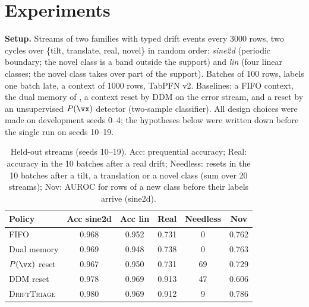 \documentclass{article}
\theoremstyle{plain}
\theoremstyle{definition}
\theoremstyle{remark}
\newcommand{\method}{\textsc{DriftTriage}}   %
\begin{document}
\section{Experiments}
\label{sec:exp}

\textbf{Setup.} Streams of two families with typed drift events every 3000 rows, two cycles over \{tilt, translate,
real, novel\} in random order: \emph{sine2d} (periodic boundary; the novel class is a band outside the support) and
\emph{lin} (four linear classes; the novel class takes over part of the support). Batches of 100 rows, labels one
batch late, a context of 1000 rows, TabPFN v2. Baselines: a FIFO context, the dual memory of
\citet{lourenco2026streams}, a context reset by DDM \citep{gama2014survey} on the error stream, and a reset by an
unsupervised $P(\vx)$ detector (two-sample classifier). All design choices were made on development seeds 0--4; the
hypotheses below were written down before the single run on seeds 10--19.

\begin{table}[t]
  \centering
  \caption{Held-out streams (seeds 10--19). Acc: prequential accuracy; Real: accuracy in the 10 batches after a real
  drift; Needless: resets in the 10 batches after a tilt, a translation or a novel class (sum over 20 streams); Nov:
  AUROC for rows of a new class before their labels arrive (sine2d).}
  \label{tab:stream}
  \small
  \setlength{\tabcolsep}{3pt}
  \begin{tabular}{lccccc}
    \toprule
    Policy & Acc sine2d & Acc lin & Real & Needless & Nov \\
    \midrule
    FIFO            & 0.968 & 0.952 & 0.731 & 0  & 0.762 \\
    Dual memory     & 0.969 & 0.948 & 0.738 & 0  & 0.763 \\
    $P(\vx)$ reset  & 0.967 & 0.950 & 0.731 & 69 & 0.729 \\
    DDM reset       & 0.978 & 0.969 & 0.913 & 47 & 0.606 \\
    \method{}       & 0.980 & 0.969 & 0.912 & 9  & 0.786 \\
    \bottomrule
  \end{tabular}
\end{table}
\end{document}
